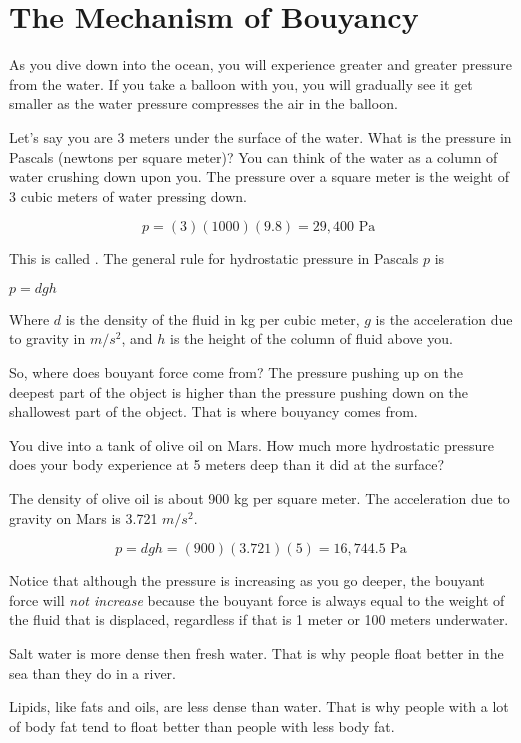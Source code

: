 \section{The Mechanism of Bouyancy}

As you dive down into the ocean, you will experience greater and
greater pressure from the water. If you take a balloon with you, you
will gradually see it get smaller as the water pressure compresses the
air in the balloon.

Let's say you are 3 meters under the surface of the water. What is the
pressure in Pascals (newtons per square meter)? You can think of the
water as a column of water crushing down upon you.  The pressure over
a square meter is the weight of 3 cubic meters of water pressing down.

$$p = (3)(1000)(9.8) = 29,400 \text{ Pa }$$

This is called . The general rule for
hydrostatic pressure in Pascals $p$ is

$p = d g h$

Where  $d$ is the density of the fluid
in kg per cubic meter, $g$ is the acceleration due to gravity in
$m/s^2$, and $h$ is the height of the column of fluid above you.

So, where does bouyant force come from? The pressure pushing up on the
deepest part of the object is higher than the pressure pushing down on
the shallowest part of the object. That is where bouyancy comes from.

\begin{Exercise}[title={Hydrostatic Pressure}, label=mars_pressure]

  You dive into a tank of olive oil on Mars.  How much more
  hydrostatic pressure does your body experience at 5 meters deep than
  it did at the surface?

  The density of olive oil is about 900 kg per square meter. The
  acceleration due to gravity on Mars is 3.721 $m/s^2$.
  
\end{Exercise}
\begin{Answer}[ref=mars_pressure]
$$p = d g h = (900)(3.721)(5) = 16,744.5 \text{ Pa}$$
\end{Answer}

Notice that although the pressure is increasing as you go deeper, the
bouyant force will \emph{not increase} because the bouyant force is always equal
to the weight of the fluid that is displaced, regardless if that is 1
meter or 100 meters underwater.

Salt water is more dense then fresh water.  That is why people float
better in the sea than they do in a river.

Lipids, like fats and oils, are less dense than water.  That is why
people with a lot of body fat tend to float better than people with
less body fat.
